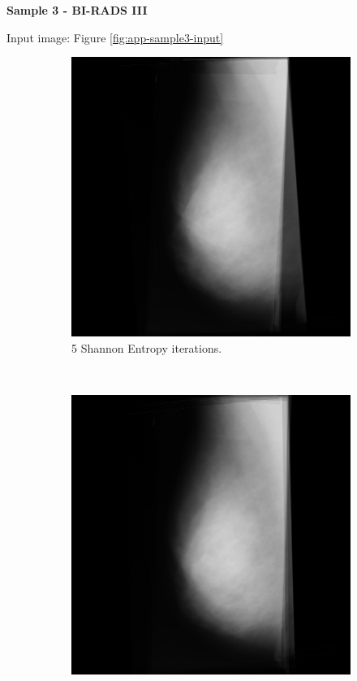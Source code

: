 \newpage
\noindent \textbf{Sample 3 - BI-RADS III}

Input image: Figure \ref{fig:app-sample3-input}

\begin{figure}[H]
    \centering
    \begin{subfigure}[t]{0.3\textwidth}
        \includegraphics[width=\textwidth]{Appendix5/sample3/shannon/5_shannon.png}
        \caption{5 Shannon Entropy iterations.}
        \label{fig:app-5-shannon-sample3}
    \end{subfigure} \hfill
    ~ %
    \begin{subfigure}[t]{0.3\textwidth}
        \includegraphics[width=\textwidth]{Appendix5/sample3/shannon/10_shannon.png}

\end{subfigure}
\end{figure}
